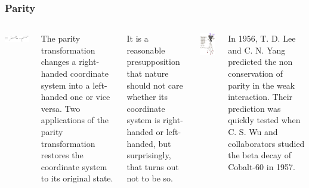 \begin{frame}
\frametitle{Parity}
\begin{columns}
\includegraphics[scale=0.45]{img/ParityCartoon.png}


The parity transformation changes a right-handed coordinate system into a left-handed one or vice versa. Two applications of the parity transformation restores the coordinate system to its original state.

It is a reasonable presupposition that nature should not care whether its coordinate system is right-handed or left-handed, \alert{but surprisingly, that turns out not to be so.}

\includegraphics[scale=0.35]{img/wu.png}

In 1956, T. D. Lee and C. N. Yang predicted the non conservation of parity in the weak interaction. Their prediction was quickly tested when C. S. Wu and collaborators studied the beta decay of Cobalt-60 in 1957.

\end{columns}

\end{frame}

